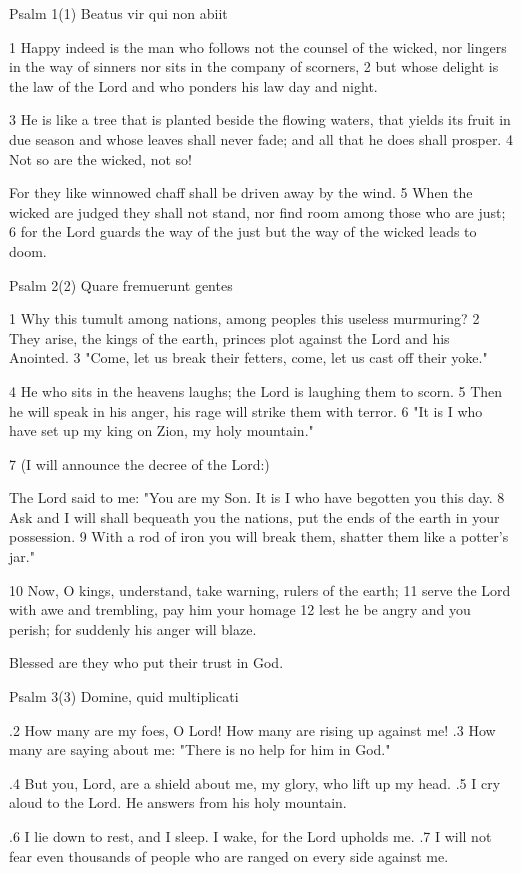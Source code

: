 Psalm 1(1) Beatus vir qui non abiit

1 Happy indeed is the man
who follows not the counsel of the wicked,
nor lingers in the way of sinners
nor sits in the company of scorners,
2 but whose delight is the law of the Lord
and who ponders his law day and night.

3 He is like a tree that is planted
beside the flowing waters,
that yields its fruit in due season
and whose leaves shall never fade;
and all that he does shall prosper.
4 Not so are the wicked, not so!

For they like winnowed chaff
shall be driven away by the wind.
5 When the wicked are judged they shall not stand,
nor find room among those who are just;
6 for the Lord guards the way of the just
but the way of the wicked leads to doom.

Psalm 2(2) Quare fremuerunt gentes

1 Why this tumult among nations,
among peoples this useless murmuring?
2 They arise, the kings of the earth,
princes plot against the Lord and his Anointed.
3 "Come, let us break their fetters,
come, let us cast off their yoke."

4 He who sits in the heavens laughs;
the Lord is laughing them to scorn.
5 Then he will speak in his anger,
his rage will strike them with terror.
6 "It is I who have set up my king on Zion,
my holy mountain."

7 (I will announce the decree of the Lord:)

The Lord said to me: "You are my Son.
It is I who have begotten you this day.
8 Ask and I will shall bequeath you the nations,
put the ends of the earth in your possession.
9 With a rod of iron you will break them,
shatter them like a potter's jar."

10 Now, O kings, understand,
take warning, rulers of the earth;
11 serve the Lord with awe
and trembling, pay him your homage
12 lest he be angry and you perish;
for suddenly his anger will blaze.

Blessed are they who put their trust in God.


Psalm 3(3) Domine, quid multiplicati

.2 How many are my foes, O Lord!
How many are rising up against me!
.3 How many are saying about me:
"There is no help for him in God."

.4 But you, Lord, are a shield about me,
my glory, who lift up my head.
.5 I cry aloud to the Lord.
He answers from his holy mountain.

.6 I lie down to rest, and I sleep.
I wake, for the Lord upholds me.
.7 I will not fear even thousands of people
who are ranged on every side against me.


